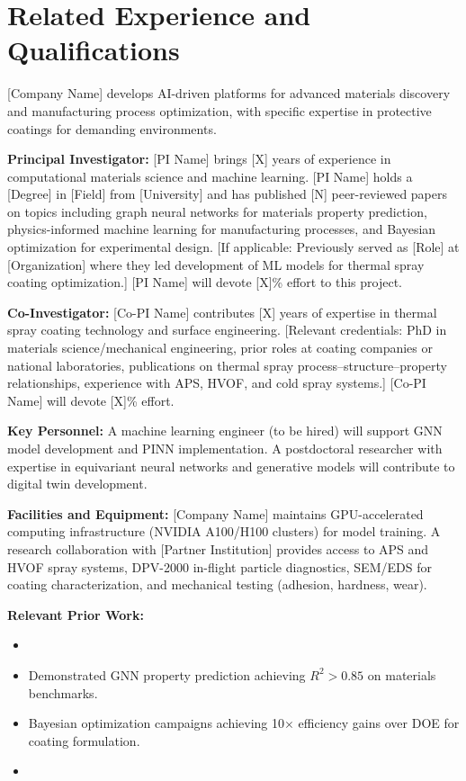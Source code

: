 \documentclass[11pt,letterpaper]{article}
\begin{document}
\section{Related Experience and Qualifications}
\label{sec:qualifications}

[Company Name] develops AI-driven platforms for advanced materials
discovery and manufacturing process optimization, with specific
expertise in protective coatings for demanding environments.

\textbf{Principal Investigator:} [PI Name] brings [X] years of
experience in computational materials science and machine learning. [PI
Name] holds a [Degree] in [Field] from [University] and has published
[N] peer-reviewed papers on topics including graph neural networks for
materials property prediction, physics-informed machine learning for
manufacturing processes, and Bayesian optimization for experimental
design. [If applicable: Previously served as [Role] at [Organization]
where they led development of ML models for thermal spray coating
optimization.] [PI Name] will devote [X]\% effort to this project.

\textbf{Co-Investigator:} [Co-PI Name] contributes [X] years of
expertise in thermal spray coating technology and surface engineering.
[Relevant credentials: PhD in materials science/mechanical engineering,
prior roles at coating companies or national laboratories, publications
on thermal spray process--structure--property relationships, experience
with APS, HVOF, and cold spray systems.] [Co-PI Name] will devote
[X]\% effort.

\textbf{Key Personnel:} A machine learning engineer (to be hired) will
support GNN model development and PINN implementation. A postdoctoral
researcher with expertise in equivariant neural networks and generative
models will contribute to digital twin development.

\textbf{Facilities and Equipment:} [Company Name] maintains
GPU-accelerated computing infrastructure (NVIDIA A100/H100 clusters)
for model training. A research collaboration with [Partner Institution]
provides access to APS and HVOF spray systems, DPV-2000 in-flight
particle diagnostics, SEM/EDS for coating characterization, and
mechanical testing (adhesion, hardness, wear).

\textbf{Relevant Prior Work:}
\begin{itemize}[nosep]
  \item [If applicable: Prior SBIR/STTR awards and their outcomes.]
  \item Demonstrated GNN property prediction achieving $R^2 > 0.85$ on
        materials benchmarks.
  \item Bayesian optimization campaigns achieving 10$\times$ efficiency
        gains over DOE for coating formulation.
  \item [Additional relevant experience in AI for manufacturing, digital
        twins, or coating technology.]
\end{itemize}
\end{document}

